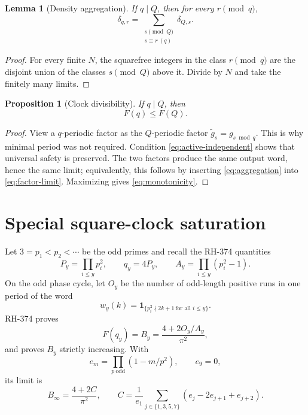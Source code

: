 \documentclass[11pt]{article}
\newtheorem{proposition}[theorem]{Proposition}
\newtheorem{lemma}[theorem]{Lemma}
\theoremstyle{definition}
\theoremstyle{remark}
\newcommand{\dd}{\delta}
\begin{document}
\begin{lemma}[Density aggregation]
If $q\mid Q$, then for every $r\pmod q$,
\begin{equation}
              \dd_{q,r}=\sum_{\substack{s\pmod Q\\s\equiv r\ (q)}}
                         \dd_{Q,s}.
 \label{eq:aggregation}
\end{equation}
\end{lemma}

\begin{proof}
For every finite $N$, the squarefree integers in the class $r\pmod q$ are
the disjoint union of the classes $s\pmod Q$ above it.  Divide by $N$ and
take the finitely many limits.
\end{proof}

\begin{proposition}[Clock divisibility]
\label{prop:clock-divisibility}
If $q\mid Q$, then
\begin{equation}
                              F(q)\le F(Q).
 \label{eq:monotonicity}
\end{equation}
\end{proposition}

\begin{proof}
View a $q$-periodic factor as the $Q$-periodic factor
$\widetilde g_s=g_{s\bmod q}$.  This is why minimal period was not required.
Condition \eqref{eq:active-independent} shows that universal safety is
preserved.  The two factors produce the same output word, hence the same
limit; equivalently, this follows by inserting \eqref{eq:aggregation} into
\eqref{eq:factor-limit}.  Maximizing gives \eqref{eq:monotonicity}.
\end{proof}

\section{Special square-clock saturation}

Let $3=p_1<p_2<\cdots$ be the odd primes and recall the RH-374 quantities
\begin{equation}
 P_y=\prod_{i\le y}p_i^2,\qquad q_y=4P_y,\qquad
 A_y=\prod_{i\le y}(p_i^2-1).
 \label{eq:square-clock}
\end{equation}
On the odd phase cycle, let $O_y$ be the number of odd-length positive runs
in one period of the word
\[
            w_y(k)=\mathbf1_{\{p_i^2\nmid2k+1\ \text{for all }i\le y\}}.
\]
RH-374 proves
\begin{equation}
             F(q_y)=B_y=\frac{4+2O_y/A_y}{\pi^2},
 \label{eq:B-y}
\end{equation}
and proves $B_y$ strictly increasing.  With
\[
 e_m=\prod_{p\ \mathrm{odd}}(1-m/p^2),\qquad e_9=0,
\]
its limit is
\begin{equation}
 B_\infty=\frac{4+2C}{\pi^2},\qquad
 C=\frac1{e_1}\sum_{j\in\{1,3,5,7\}}
       (e_j-2e_{j+1}+e_{j+2}).
 \label{eq:B-infinity}
\end{equation}
\end{document}
